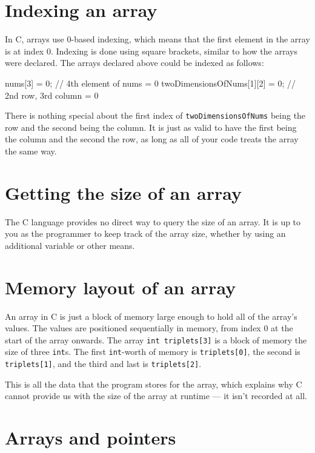 \section{Indexing an array}

In C, arrays use 0-based indexing, which means that the first element in the array is at index 0.
Indexing is done using square brackets, similar to how the arrays were declared.
The arrays declared above could be indexed as follows:

\begin{codeblock}
nums[3] = 0; // 4th element of nums = 0
twoDimensionsOfNums[1][2] = 0; // 2nd row, 3rd column = 0
\end{codeblock}

There is nothing special about the first index of \lstinline!twoDimensionsOfNums! being the row and the second being the column.
It is just as valid to have the first being the column and the second the row, as long as all of your code treats the array the same way.

\section{Getting the size of an array}

The C language provides no direct way to query the size of an array.
It is up to you as the programmer to keep track of the array size, whether by using an additional variable or other means.

\section{Memory layout of an array}

An array in C is just a block of memory large enough to hold all of the array's values.
The values are positioned sequentially in memory, from index 0 at the start of the array onwards.
The array \lstinline!int triplets[3]! is a block of memory the size of three \lstinline!int!s.
The first \lstinline!int!-worth of memory is \lstinline!triplets[0]!, the second is \lstinline!triplets[1]!, and the third and last is \lstinline!triplets[2]!.

This is all the data that the program stores for the array, which explains why C cannot provide us with the size of the array at runtime --- it isn't recorded at all.

\section{Arrays and pointers}

